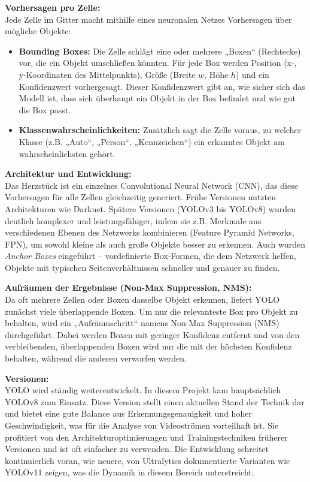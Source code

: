 \textbf{Vorhersagen pro Zelle:} \\
Jede Zelle im Gitter macht mithilfe eines neuronalen Netzes Vorhersagen über mögliche Objekte:
\begin{itemize}
    \item \textbf{Bounding Boxes:} Die Zelle schlägt eine oder mehrere „Boxen“ (Rechtecke) vor, die ein Objekt umschließen könnten. Für jede Box werden Position (x-, y-Koordinaten des Mittelpunkts), Größe (Breite $w$, Höhe $h$) und ein Konfidenzwert vorhergesagt. Dieser Konfidenzwert gibt an, wie sicher sich das Modell ist, dass sich überhaupt ein Objekt in der Box befindet und wie gut die Box passt.
    \item \textbf{Klassenwahrscheinlichkeiten:} Zusätzlich sagt die Zelle voraus, zu welcher Klasse (z.B. „Auto“, „Person“, „Kennzeichen“) ein erkanntes Objekt am wahrscheinlichsten gehört.
\end{itemize}

\textbf{Architektur und Entwicklung:} \\
Das Herzstück ist ein einzelnes Convolutional Neural Network (CNN), das diese Vorhersagen für alle Zellen gleichzeitig generiert. Frühe Versionen nutzten Architekturen wie Darknet. Spätere Versionen (YOLOv3 bis YOLOv8) wurden deutlich komplexer und leistungsfähiger, indem sie z.B. Merkmale aus verschiedenen Ebenen des Netzwerks kombinieren (Feature Pyramid Networks, FPN), um sowohl kleine als auch große Objekte besser zu erkennen. Auch wurden \textit{Anchor Boxes} eingeführt – vordefinierte Box-Formen, die dem Netzwerk helfen, Objekte mit typischen Seitenverhältnissen schneller und genauer zu finden.

\textbf{Aufräumen der Ergebnisse (Non-Max Suppression, NMS):} \\
Da oft mehrere Zellen oder Boxen dasselbe Objekt erkennen, liefert YOLO zunächst viele überlappende Boxen. Um nur die relevanteste Box pro Objekt zu behalten, wird ein „Aufräumschritt“ namens Non-Max Suppression (NMS) durchgeführt. Dabei werden Boxen mit geringer Konfidenz entfernt und von den verbleibenden, überlappenden Boxen wird nur die mit der höchsten Konfidenz behalten, während die anderen verworfen werden.

\textbf{Versionen:} \\
YOLO wird ständig weiterentwickelt. In diesem Projekt kam hauptsächlich YOLOv8 zum Einsatz. Diese Version stellt einen aktuellen Stand der Technik dar und bietet eine gute Balance aus Erkennungsgenauigkeit und hoher Geschwindigkeit, was für die Analyse von Videoströmen vorteilhaft ist. Sie profitiert von den Architekturoptimierungen und Trainingstechniken früherer Versionen und ist oft einfacher zu verwenden. Die Entwicklung schreitet kontinuierlich voran, wie neuere, von Ultralytics dokumentierte Varianten wie YOLOv11 zeigen, was die Dynamik in diesem Bereich unterstreicht.


